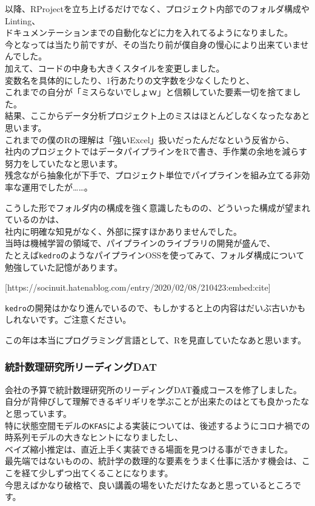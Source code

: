 \documentclass[
  letterpaper,
  DIV=11,
  numbers=noendperiod]{scrartcl}
\begin{document}
以降、RProjectを立ち上げるだけでなく、プロジェクト内部でのフォルダ構成やLinting、\\
ドキュメンテーションまでの自動化などに力を入れてるようになりました。\\
今となっては当たり前ですが、その当たり前が僕自身の慢心により出来ていませんでした。\\
加えて、コードの中身も大きくスタイルを変更しました。\\
変数名を具体的にしたり、1行あたりの文字数を少なくしたりと、\\
これまでの自分が「ミスらないでしょｗ」と信頼していた要素一切を捨てました。\\
結果、ここからデータ分析プロジェクト上のミスはほとんどしなくなったなあと思います。\\
これまでの僕のRの理解は「強いExcel」扱いだったんだなという反省から、\\
社内のプロジェクトではデータパイプラインをRで書き、手作業の余地を減らす努力をしていたなと思います。\\
残念ながら抽象化が下手で、プロジェクト単位でパイプラインを組み立てる非効率な運用でしたが\ldots\ldots。

こうした形でフォルダ内の構成を強く意識したものの、どういった構成が望まれているのかは、\\
社内に明確な知見がなく、外部に探すほかありませんでした。\\
当時は機械学習の領域で、パイプラインのライブラリの開発が盛んで、\\
たとえば\texttt{kedro}のようなパイプラインOSSを使ってみて、フォルダ構成について勉強していた記憶があります。

{[}https://socinuit.hatenablog.com/entry/2020/02/08/210423:embed:cite{]}

\texttt{kedro}の開発はかなり進んでいるので、もしかすると上の内容はだいぶ古いかもしれないです。ご注意ください。

この年は本当にプログラミング言語として、Rを見直していたなあと思います。

\hypertarget{ux7d71ux8a08ux6570ux7406ux7814ux7a76ux6240ux30eaux30fcux30c7ux30a3ux30f3ux30b0dat}{%
\subsubsection{統計数理研究所リーディングDAT}\label{ux7d71ux8a08ux6570ux7406ux7814ux7a76ux6240ux30eaux30fcux30c7ux30a3ux30f3ux30b0dat}}

会社の予算で統計数理研究所のリーディングDAT養成コースを修了しました。\\
自分が背伸びして理解できるギリギリを学ぶことが出来たのはとても良かったなと思っています。\\
特に状態空間モデルの\texttt{KFAS}による実装については、後述するようにコロナ禍での時系列モデルの大きなヒントになりましたし、\\
ベイズ縮小推定は、直近上手く実装できる場面を見つける事ができました。\\
最先端ではないものの、統計学の数理的な要素をうまく仕事に活かす機会は、ここを経て少しずつ出てくることになります。\\
今思えばかなり破格で、良い講義の場をいただけたなあと思っているところです。
\end{document}
